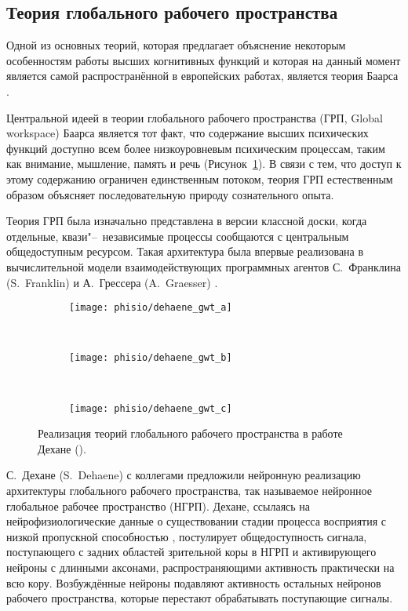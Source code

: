 \subsection{Теория глобального рабочего пространства}

Одной из основных теорий, которая предлагает объяснение некоторым особенностям работы высших когнитивных функций и которая на данный момент является самой распространённой в европейских работах, является теория Баарса \cite{Baars1988,Baars2005}.

Центральной идеей в теории глобального рабочего пространства (ГРП, Global workspace) Баарса является тот факт, что содержание высших психических функций доступно всем более низкоуровневым психическим процессам, таким как внимание, мышление, память и речь (Рисунок~\ref{fg:dehaene_gwt_a}). В связи с тем, что доступ к этому содержанию ограничен единственным потоком, теория ГРП естественным образом объясняет последовательную природу сознательного опыта.

Теория ГРП была изначально представлена в версии классной доски, когда отдельные, квази"--~независимые процессы сообщаются с центральным общедоступным ресурсом. Такая архитектура была впервые реализована в вычислительной модели взаимодействующих программных агентов С.~Франклина (S.~Franklin) и А.~Грессера (A.~Graesser) \cite{Franklin1999}.

\begin{figure}[h]
	\centering
	\begin{subfigure}[b]{0.3\textwidth}
		\texttt{[image: phisio/dehaene\_gwt\_a]}
		\caption{}
		\label{fg:dehaene_gwt_a}
	\end{subfigure}
	~ 
	\begin{subfigure}[b]{0.3\textwidth}
		\texttt{[image: phisio/dehaene\_gwt\_b]}
		\caption{}
		\label{fg:dehaene_gwt_b}
	\end{subfigure}
	~ 
	\begin{subfigure}[b]{0.3\textwidth}
		\texttt{[image: phisio/dehaene\_gwt\_c]}
		\caption{}
		\label{fg:dehaene_gwt_c}
	\end{subfigure}
	\caption{Реализация теорий глобального рабочего пространства в работе Дехане (\cite{Dehaene2003}).}
	\label{fg:dehaene_gwt}
\end{figure}

С.~Дехане (S.~Dehaene) с коллегами \cite{Dehaene2003} предложили нейронную реализацию архитектуры глобального рабочего пространства, так называемое нейронное глобальное рабочее пространство (НГРП). Дехане, ссылаясь на нейрофизиологические данные о существовании стадии процесса восприятия с низкой пропускной способностью \cite{Chun1995}, постулирует общедоступность сигнала, поступающего с задних областей зрительной коры в НГРП и активирующего нейроны с длинными аксонами, распространяющими активность практически на всю кору. Возбуждённые нейроны подавляют активность остальных нейронов рабочего пространства, которые перестают обрабатывать поступающие сигналы. 

